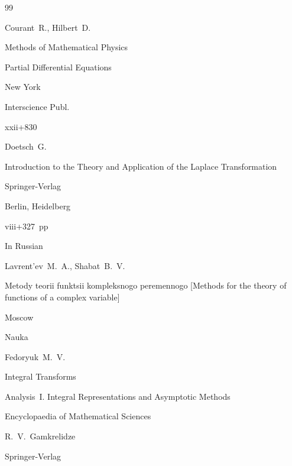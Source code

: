 \begin{thebibliography}{99}




\by Courant~R., Hilbert~D.

\book Methods of Mathematical Physics


\volinfo Partial Differential Equations

\publaddr New York

\publ Interscience Publ.


\totalpages xxii+830




\by Doetsch~G.

\book Introduction to the Theory and Application of the Laplace Transformation

\publ Springer-Verlag 

\publaddr Berlin, Heidelberg


\totalpages viii+327~pp \nofrills





\lang In Russian 

\by Lavrent'ev~M.~A., Shabat~B.~V.

\book Metody teorii funktsii kompleksnogo peremennogo \rm [Methods for the theory of functions of a complex variable]

\publaddr Moscow

\publ Nauka








\by Fedoryuk~M.~V.

\paper Integral Transforms

\inbook Analysis~I. Integral Representations and Asymptotic Methods

\serial Encyclopaedia of Mathematical Sciences


\ed R.~V.~Gamkrelidze

\publ Springer-Verlag


\end{thebibliography}
